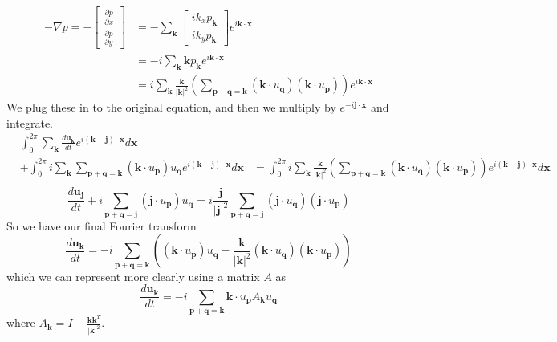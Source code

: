 \documentclass[12pt]{article}
\begin{document}
\begin{align*}
-\nabla{p}=-\begin{bmatrix}\frac{\partial{p}}{\partial{x}}\\\frac{\partial{p}}{\partial{y}}\end{bmatrix}&=-\sum_\mathbf{k}\begin{bmatrix}ik_xp_\mathbf{k}\\ik_yp_\mathbf{k}\end{bmatrix}e^{i\mathbf{k\cdot{x}}}\\
&=-i\sum_\mathbf{k}\mathbf{k}p_\mathbf{k}e^{i\mathbf{k\cdot{x}}}\\
&=i\sum_\mathbf{k}\frac{\mathbf{k}}{|\mathbf{k}|^2}\left(\sum_\mathbf{p+q=k}(\mathbf{k}\cdot{u}_\mathbf{q})(\mathbf{k}\cdot{u}_\mathbf{p})\right)e^{i\mathbf{k\cdot{x}}}
\end{align*}
We plug these in to the original equation, and then we multiply by $e^{-i\mathbf{j\cdot{x}}}$ and integrate.
\begin{align*}
&\int^{2\pi}_0\sum_\mathbf{k}\frac{d\mathbf{u_k}}{dt}e^{i(\mathbf{k-j})\cdot\mathbf{x}}d\mathbf{x}&\\
&+\int^{2\pi}_0i\sum_\mathbf{k}\sum_\mathbf{p+q=k}(\mathbf{k}\cdot{u}_\mathbf{p})u_\mathbf{q}e^{i(\mathbf{k-j})\cdot\mathbf{x}}d\mathbf{x}&=\int^{2\pi}_0i\sum_\mathbf{k}\frac{\mathbf{k}}{|\mathbf{k}|^2}\left(\sum_\mathbf{p+q=k}(\mathbf{k}\cdot{u}_\mathbf{q})(\mathbf{k}\cdot{u}_\mathbf{p})\right)e^{i(\mathbf{k-j})\cdot\mathbf{x}}d\mathbf{x}\\
\end{align*}
\[
\frac{d\mathbf{u_j}}{dt}+i\sum_\mathbf{p+q=j}(\mathbf{j}\cdot{u}_\mathbf{p})u_\mathbf{q} = i\frac{\mathbf{j}}{|\mathbf{j}|^2}\sum_\mathbf{p+q=j}(\mathbf{j}\cdot{u}_\mathbf{q})(\mathbf{j}\cdot{u}_\mathbf{p})
\]
So we have our final Fourier transform
\[
\frac{d\mathbf{u_k}}{dt}=-i\sum_\mathbf{p+q=k}\left((\mathbf{k}\cdot{u}_\mathbf{p})u_\mathbf{q}-\frac{\mathbf{k}}{|\mathbf{k}|^2}(\mathbf{k}\cdot{u}_\mathbf{q})(\mathbf{k}\cdot{u}_\mathbf{p})\right)
\]
which we can represent more clearly using a matrix $A$ as
\[
\frac{d\mathbf{u_k}}{dt}=-i\sum_\mathbf{p+q=k}\mathbf{k}\cdot{u}_\mathbf{p}A_\mathbf{k}u_\mathbf{q}
\]
where $A_\mathbf{k}=I-\frac{\mathbf{kk}^T}{|\mathbf{k}|^2}$.
\end{document}
